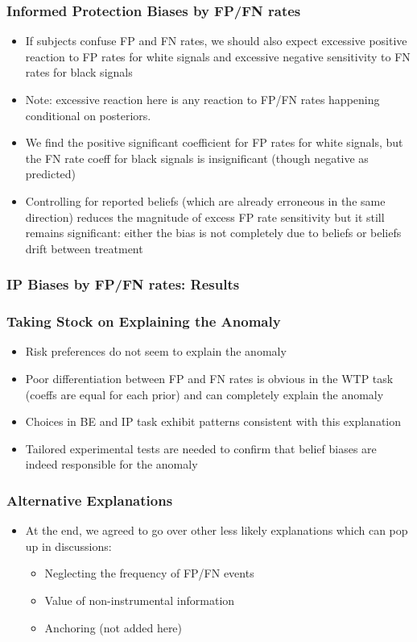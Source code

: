 \documentclass[11pt,hyperref={bookmarks=false}]{beamer}
\begin{document}
\begin{frame}
\frametitle{Informed Protection Biases by FP/FN rates}
\begin{itemize}
\item If subjects confuse FP and FN rates, we should also expect excessive positive reaction to FP rates for white signals and excessive negative sensitivity to FN rates for black signals
\item Note: excessive reaction here is any reaction to FP/FN rates happening conditional on posteriors. 
\item We find the positive significant coefficient for FP rates for white signals, but the FN rate coeff for black signals is insignificant (though negative as predicted)
\item Controlling for reported beliefs (which are already erroneous in the same direction) reduces the magnitude of excess FP rate sensitivity but it still remains significant: either the bias is not completely due to beliefs or beliefs drift between treatment
\end{itemize}
\end{frame}


\begin{frame}
\frametitle{IP Biases by FP/FN rates: Results}
\scriptsize
\begin{center}

\end{center}
\end{frame}




\begin{frame}
\frametitle{Taking Stock on Explaining the Anomaly}
\begin{itemize}
\item Risk preferences do not seem to explain the anomaly
\item Poor differentiation between FP and FN rates is obvious in the WTP task (coeffs are equal for each prior) and can completely explain the anomaly
\item Choices in BE and IP task exhibit patterns consistent with this explanation
\item Tailored experimental tests are needed to confirm that belief biases are indeed responsible for the anomaly
\end{itemize}
\end{frame}



\begin{frame}
\frametitle{Alternative Explanations}
\begin{itemize}
\item At the end, we agreed to go over other less likely explanations which can pop up in discussions:
\begin{itemize}
\item Neglecting the frequency of FP/FN events
\item Value of non-instrumental information
\item Anchoring (not added here)
\end{itemize}
\end{itemize}
\end{frame}
\end{document}
